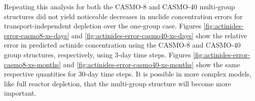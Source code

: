    Repeating this analysis for both the CASMO-8 and CASMO-40 multi-group
    structures did not yield noticeable decreases in nuclide concentration
    errors for transport-independent depletion over the one-group case.  Figures
    \ref{fig:actinides-error-casmo8-xs-days} and
    \ref{fig:actinides-error-casmo40-xs-days} show the relative error in
    predicted actinide concentration using the CASMO-8 and CASMO-40 group
    structures, respectively, using 3-day time steps. Figures
    \ref{fig:actinides-error-casmo8-xs-months} and
    \ref{fig:actinides-error-casmo40-xs-months} show the same respective
    quantities for 30-day time steps.  It is possible in more complex models,
    like full reactor depletion, that the multi-group structure will become more
    important. 

    \begin{figure}[htpb]
        \centering
        \\
\end{figure}
